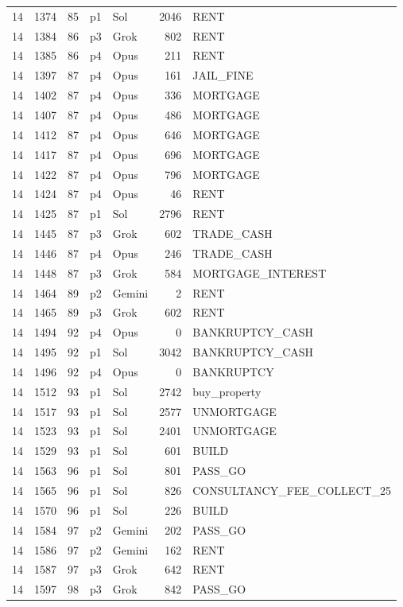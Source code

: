 \begin{longtable}{r r r l l r L{2.2in}}
14 & 1374 & 85 & p1 & Sol & 2046 & RENT \\
14 & 1384 & 86 & p3 & Grok & 802 & RENT \\
14 & 1385 & 86 & p4 & Opus & 211 & RENT \\
14 & 1397 & 87 & p4 & Opus & 161 & JAIL\_FINE \\
14 & 1402 & 87 & p4 & Opus & 336 & MORTGAGE \\
14 & 1407 & 87 & p4 & Opus & 486 & MORTGAGE \\
14 & 1412 & 87 & p4 & Opus & 646 & MORTGAGE \\
14 & 1417 & 87 & p4 & Opus & 696 & MORTGAGE \\
14 & 1422 & 87 & p4 & Opus & 796 & MORTGAGE \\
14 & 1424 & 87 & p4 & Opus & 46 & RENT \\
14 & 1425 & 87 & p1 & Sol & 2796 & RENT \\
14 & 1445 & 87 & p3 & Grok & 602 & TRADE\_CASH \\
14 & 1446 & 87 & p4 & Opus & 246 & TRADE\_CASH \\
14 & 1448 & 87 & p3 & Grok & 584 & MORTGAGE\_INTEREST \\
14 & 1464 & 89 & p2 & Gemini & 2 & RENT \\
14 & 1465 & 89 & p3 & Grok & 602 & RENT \\
14 & 1494 & 92 & p4 & Opus & 0 & BANKRUPTCY\_CASH \\
14 & 1495 & 92 & p1 & Sol & 3042 & BANKRUPTCY\_CASH \\
14 & 1496 & 92 & p4 & Opus & 0 & BANKRUPTCY \\
14 & 1512 & 93 & p1 & Sol & 2742 & buy\_property \\
14 & 1517 & 93 & p1 & Sol & 2577 & UNMORTGAGE \\
14 & 1523 & 93 & p1 & Sol & 2401 & UNMORTGAGE \\
14 & 1529 & 93 & p1 & Sol & 601 & BUILD \\
14 & 1563 & 96 & p1 & Sol & 801 & PASS\_GO \\
14 & 1565 & 96 & p1 & Sol & 826 & CONSULTANCY\_FEE\_COLLECT\_25 \\
14 & 1570 & 96 & p1 & Sol & 226 & BUILD \\
14 & 1584 & 97 & p2 & Gemini & 202 & PASS\_GO \\
14 & 1586 & 97 & p2 & Gemini & 162 & RENT \\
14 & 1587 & 97 & p3 & Grok & 642 & RENT \\
14 & 1597 & 98 & p3 & Grok & 842 & PASS\_GO \\

\end{longtable}
